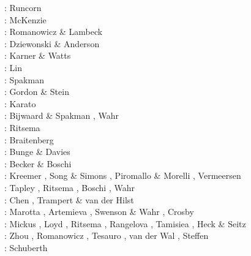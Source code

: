 \begin{scriptsize}
\nineteensixtyfour: Runcorn \cite{runc64}\\
\nineteensixtyseven: McKenzie \cite{mcke67}\\
\nineteenseventyseven: Romanowicz \& Lambeck \cite{rola77}\\
\nineteeneightyone: Dziewonski \& Anderson \cite{dzan81}\\
\nineteeneightythree: Karner \& Watts \cite{kawa83}\\
\nineteenninety: Lin \etal \cite{lips90}\\
\nineteenninetyone: Spakman \cite{spak91}\\
\nineteenninetytwo: Gordon \& Stein \cite{gost92}\\
\nineteenninetythree: Karato \cite{kara93}\\
\nineteenninetyeight: Bijwaard \& Spakman \cite{bisp98}, Wahr \etal \cite{wamb98}\\
\nineteenninetynine: Ritsema \etal \cite{rivw99}\\
\twothousand: Braitenberg \etal \cite{brzf00}\\
\twothousandone: Bunge \& Davies \cite{buda01}\\
\twothousandtwo: Becker \& Boschi \cite{bebo02}\\
\twothousandthree: Kreemer \etal \cite{krhh03}, Song \& Simons \cite{sosi03}, 
                   Piromallo \& Morelli \cite{pimo03}, Vermeersen \cite{verm03}\\
\twothousandfour: Tapley \etal \cite{tabr04}, Ritsema \etal \cite{rivw04}, Boschi \etal \cite{boek04},
                  Wahr \etal \cite{wasz04}\\
\twothousandfive: Chen \etal \cite{chrw05}, Trampert \& van der Hilst \cite{trva05}\\
\twothousandsix: Marotta \etal \cite{masr06}, Artemieva \cite{arte06}, 
                 Swenson \& Wahr \cite{swwa06}, Crosby \etal \cite{crms06}\\
\twothousandseven: Mickus \etal \cite{mitk07}, Loyd \etal \cite{lobc07}, Ritsema \etal \cite{rimb07}, 
                   Rangelova \etal \cite{ravb07}, Tamisiea \etal \cite{tamd07}, 
                   Heck \& Seitz \cite{hese07}\\
\twothousandeight: Zhou \cite{zhou08}, Romanowicz \cite{roma08}, 
                   Tesauro \etal \cite{tekc08}, van der Wal \cite{vaws08}, 
                   Steffen \etal \cite{stdm08}\\
\twothousandnine: Schuberth \etal \cite{scbr09}\\

\end{scriptsize}
